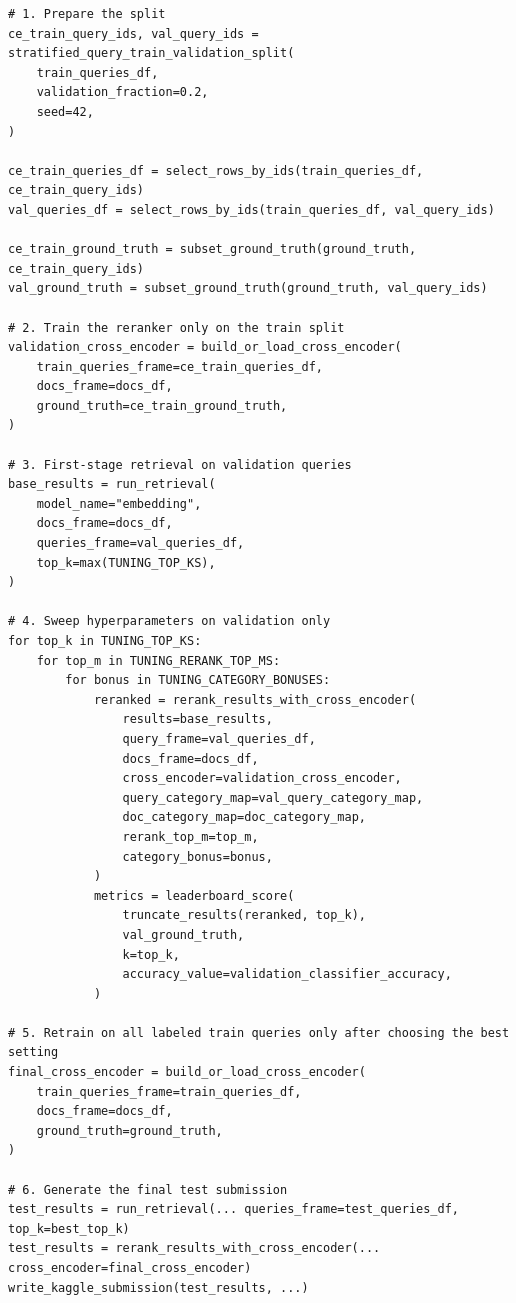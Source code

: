 \documentclass[10pt]{article}
\begin{document}
\begin{lstlisting}[caption={A simplified study version of the notebook pipeline}]
# 1. Prepare the split
ce_train_query_ids, val_query_ids = stratified_query_train_validation_split(
    train_queries_df,
    validation_fraction=0.2,
    seed=42,
)

ce_train_queries_df = select_rows_by_ids(train_queries_df, ce_train_query_ids)
val_queries_df = select_rows_by_ids(train_queries_df, val_query_ids)

ce_train_ground_truth = subset_ground_truth(ground_truth, ce_train_query_ids)
val_ground_truth = subset_ground_truth(ground_truth, val_query_ids)

# 2. Train the reranker only on the train split
validation_cross_encoder = build_or_load_cross_encoder(
    train_queries_frame=ce_train_queries_df,
    docs_frame=docs_df,
    ground_truth=ce_train_ground_truth,
)

# 3. First-stage retrieval on validation queries
base_results = run_retrieval(
    model_name="embedding",
    docs_frame=docs_df,
    queries_frame=val_queries_df,
    top_k=max(TUNING_TOP_KS),
)

# 4. Sweep hyperparameters on validation only
for top_k in TUNING_TOP_KS:
    for top_m in TUNING_RERANK_TOP_MS:
        for bonus in TUNING_CATEGORY_BONUSES:
            reranked = rerank_results_with_cross_encoder(
                results=base_results,
                query_frame=val_queries_df,
                docs_frame=docs_df,
                cross_encoder=validation_cross_encoder,
                query_category_map=val_query_category_map,
                doc_category_map=doc_category_map,
                rerank_top_m=top_m,
                category_bonus=bonus,
            )
            metrics = leaderboard_score(
                truncate_results(reranked, top_k),
                val_ground_truth,
                k=top_k,
                accuracy_value=validation_classifier_accuracy,
            )

# 5. Retrain on all labeled train queries only after choosing the best setting
final_cross_encoder = build_or_load_cross_encoder(
    train_queries_frame=train_queries_df,
    docs_frame=docs_df,
    ground_truth=ground_truth,
)

# 6. Generate the final test submission
test_results = run_retrieval(... queries_frame=test_queries_df, top_k=best_top_k)
test_results = rerank_results_with_cross_encoder(... cross_encoder=final_cross_encoder)
write_kaggle_submission(test_results, ...)
\end{lstlisting}
\end{document}
